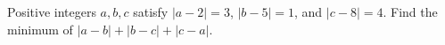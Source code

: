 Positive integers $a,b,c$ satisfy $|a-2|=3$, $|b-5|=1$, and $|c-8|=4$. Find the minimum of $|a-b|+|b-c|+|c-a|$.
